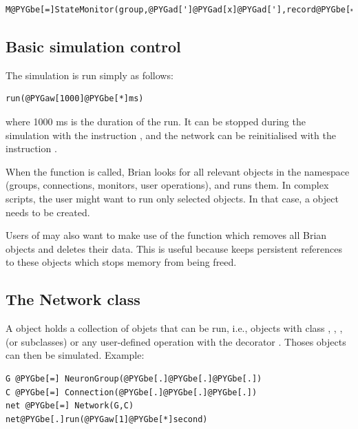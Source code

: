 \documentclass[letterpaper,10pt,english]{manual}
\begin{document}
\begin{Verbatim}[commandchars=@\[\]]
M@PYGbe[=]StateMonitor(group,@PYGad[']@PYGad[x]@PYGad['],record@PYGbe[=]@PYGaA[True],when@PYGbe[=]@PYGad[']@PYGad[before@_resets]@PYGad['])
\end{Verbatim}


\subsection{Basic simulation control}

The simulation is run simply as follows:

\begin{Verbatim}[commandchars=@\[\]]
run(@PYGaw[1000]@PYGbe[*]ms)
\end{Verbatim}

where 1000 ms is the duration of the run. It can be stopped during the simulation with the instruction
, and the network can be reinitialised with the instruction .

When the \hyperlink{brian.run}{} function is called, Brian looks for all relevant
objects in the namespace (groups, connections, monitors, user operations), and runs them.
In complex scripts, the user might want to run only selected objects. In that case, a \hyperlink{brian.Network}{} object
needs to be created.

Users of  may also want to make use of the \hyperlink{brian.clear}{} function which removes all Brian objects
and deletes their data. This is useful because  keeps persistent references to these objects
which stops memory from being freed.


\subsection{The Network class}

A \hyperlink{brian.Network}{} object holds a collection of objets that can be run, i.e., objects with class \hyperlink{brian.NeuronGroup}{},
\hyperlink{brian.Connection}{}, \hyperlink{brian.SpikeMonitor}{}, \hyperlink{brian.StateMonitor}{} (or subclasses) or any user-defined operation with the decorator
\hyperlink{brian.network_operation}{}. Thoses objects can then be simulated. Example:

\begin{Verbatim}[commandchars=@\[\]]
G @PYGbe[=] NeuronGroup(@PYGbe[.]@PYGbe[.]@PYGbe[.])
C @PYGbe[=] Connection(@PYGbe[.]@PYGbe[.]@PYGbe[.])
net @PYGbe[=] Network(G,C)
net@PYGbe[.]run(@PYGaw[1]@PYGbe[*]second)
\end{Verbatim}
\end{document}
